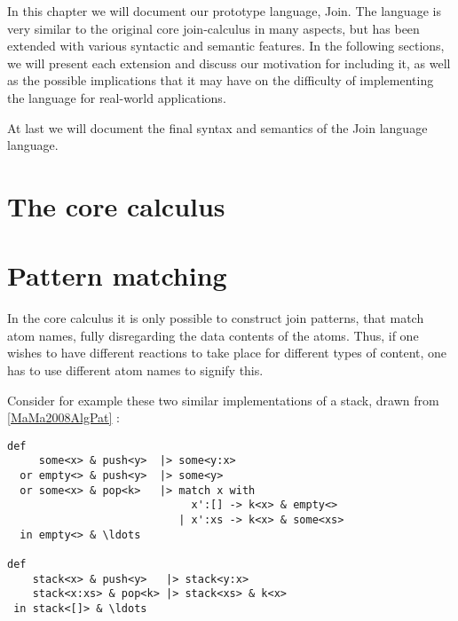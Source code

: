 \def\A{\mathcal{A}}
\def\C{\mathcal{C}}
\def\M{\mathcal{M}}
\def\D{\mathcal{D}}
\def\P{\mathcal{P}}
\def\S{\mathcal{S}}
\def\Q{\mathcal{Q}}
\def\atm#1<#2>{#1\left\langle#2\right\rangle}
\def\Go<#1>{\text{go}\left\langle#1\right\rangle}
\def\Halt<>{\text{halt}\langle\rangle}
\def\toJ#1{\stackrel{#1}{\triangleright}}
\def\inJ{~\mathbf{in}~}
\def\join#1in#2#3{#1\toJ{#2}#3}
\def\mscG#1#2{\vdash^{#1}_{#2}}
\def\mscJ{\mscG{t}{\phi}}
\def\timeJ#1{\stackrel{#1}{\propto}}
\def\defJ{~\mathbf{def}~}
\def\match{~\mathbf{match}~}
\def\with{~\mathbf{with}~}
\def\linkUp#1{\stackrel{#1}{\diamond}}
\def\migrates(#1,#2){\xLongrightarrow{#1\mapsto#2}}
\def\reduceable(#1){\text{reduceable}\left(#1\right)}
\def\quiet(#1){\text{quiet}\left(#1\right)}
\def\halted(#1){\text{halted}\left(#1\right)}
\def\doms#1{\fbox{\rule[-0.75em]{0pt}{2em}#1}}

In this chapter we will document our prototype language, Join.  The
language is very similar to the original core join-calculus in many
aspects, but has been extended with various syntactic and semantic
features. In the following sections, we will present each extension
and discuss our motivation for including it, as well as the possible
implications that it may have on the difficulty of implementing the
language for real-world applications.

At last we will document the final syntax and semantics of the Join
language language.

\section{The core calculus}

\section{Pattern matching}
In the core calculus it is only possible to construct join patterns, that match
atom names, fully disregarding the data contents of the atoms. Thus, if one wishes
to have different reactions to take place for different types of content, one
has to use different atom names to signify this.

Consider for example these two similar implementations of a stack, drawn from \ref{MaMa2008AlgPat} :
\begin{verbatim}
def
     some<x> & push<y>  |> some<y:x>
  or empty<> & push<y>  |> some<y>
  or some<x> & pop<k>   |> match x with
                             x':[] -> k<x> & empty<>
                           | x':xs -> k<x> & some<xs>
  in empty<> & \ldots

def
    stack<x> & push<y>   |> stack<y:x>
    stack<x:xs> & pop<k> |> stack<xs> & k<x>
 in stack<[]> & \ldots
\end{verbatim}

